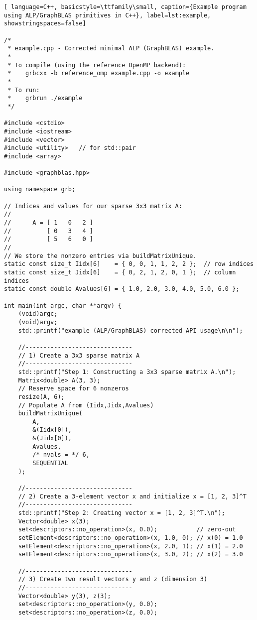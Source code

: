 \begin{lstlisting}[ language=C++, basicstyle=\ttfamily\small, caption={Example program using ALP/GraphBLAS primitives in C++}, label=lst:example, showstringspaces=false]

/*
 * example.cpp - Corrected minimal ALP (GraphBLAS) example.
 *
 * To compile (using the reference OpenMP backend):
 *    grbcxx -b reference_omp example.cpp -o example
 *
 * To run:
 *    grbrun ./example
 */

#include <cstdio>
#include <iostream>
#include <vector>
#include <utility>   // for std::pair
#include <array>

#include <graphblas.hpp>

using namespace grb;

// Indices and values for our sparse 3x3 matrix A:
//
//      A = [ 1   0   2 ]
//          [ 0   3   4 ]
//          [ 5   6   0 ]
//
// We store the nonzero entries via buildMatrixUnique.
static const size_t Iidx[6]    = { 0, 0, 1, 1, 2, 2 };  // row indices
static const size_t Jidx[6]    = { 0, 2, 1, 2, 0, 1 };  // column indices
static const double Avalues[6] = { 1.0, 2.0, 3.0, 4.0, 5.0, 6.0 };

int main(int argc, char **argv) {
    (void)argc;
    (void)argv;
    std::printf("example (ALP/GraphBLAS) corrected API usage\n\n");

    //------------------------------
    // 1) Create a 3x3 sparse matrix A
    //------------------------------
    std::printf("Step 1: Constructing a 3x3 sparse matrix A.\n");
    Matrix<double> A(3, 3);
    // Reserve space for 6 nonzeros
    resize(A, 6);
    // Populate A from (Iidx,Jidx,Avalues)
    buildMatrixUnique(
        A,
        &(Iidx[0]),
        &(Jidx[0]),
        Avalues,
        /* nvals = */ 6,
        SEQUENTIAL
    );

    //------------------------------
    // 2) Create a 3-element vector x and initialize x = [1, 2, 3]^T
    //------------------------------
    std::printf("Step 2: Creating vector x = [1, 2, 3]^T.\n");
    Vector<double> x(3);
    set<descriptors::no_operation>(x, 0.0);           // zero-out
    setElement<descriptors::no_operation>(x, 1.0, 0); // x(0) = 1.0
    setElement<descriptors::no_operation>(x, 2.0, 1); // x(1) = 2.0
    setElement<descriptors::no_operation>(x, 3.0, 2); // x(2) = 3.0

    //------------------------------
    // 3) Create two result vectors y and z (dimension 3)
    //------------------------------
    Vector<double> y(3), z(3);
    set<descriptors::no_operation>(y, 0.0);
    set<descriptors::no_operation>(z, 0.0);


\end{lstlisting}

